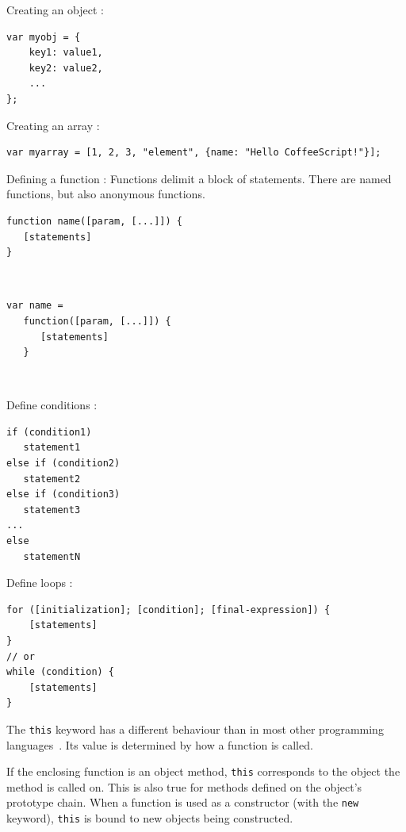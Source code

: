 \documentclass[a4paper,10pt]{article}
\begin{document}
Creating an object :
\begin{lstlisting}
var myobj = {
	key1: value1,
	key2: value2,
	...
};
\end{lstlisting}


Creating an array :
\begin{lstlisting}
var myarray = [1, 2, 3, "element", {name: "Hello CoffeeScript!"}];
\end{lstlisting}

Defining a function :
Functions delimit a block of statements.
There are named functions, but also anonymous functions.


\begin{minipage}[c]{.5\linewidth}
   \begin{lstlisting}[title=Named function,captionpos=t]
function name([param, [...]]) {
   [statements]
}
  \end{lstlisting}
~\\

\end{minipage} \hfill
\begin{minipage}[c]{.5\linewidth}
   \begin{lstlisting}[title=Anonymous function,captionpos=t]
var name =
   function([param, [...]]) {
      [statements]
   }
\end{lstlisting}
~\\

\end{minipage}


Define conditions :

\begin{lstlisting}
if (condition1)
   statement1
else if (condition2)
   statement2
else if (condition3)
   statement3
...
else
   statementN
\end{lstlisting}

Define loops :

\begin{lstlisting}
for ([initialization]; [condition]; [final-expression]) {
    [statements]
}
// or
while (condition) {
    [statements]
}
\end{lstlisting}


The \lstinline|this| keyword has a different behaviour than in most other programming \mbox{languages \cite{js:this}.}
Its value is determined by how a function is called.

If the enclosing function is an object method, \lstinline|this| corresponds to the object the method is called on. This is also true for methods defined on the object’s prototype chain. When a function is used as a constructor (with the \lstinline|new| keyword), \lstinline|this| is bound to new objects being constructed.
\end{document}
